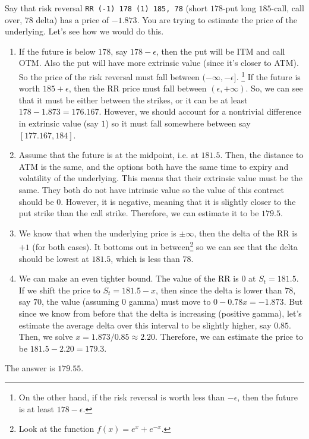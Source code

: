 \documentclass{article}
\begin{document}
    \begin{example}
      Say that risk reversal \texttt{RR (-1) 178 (1) 185, 78} (short $178$-put long $185$-call, call over, 78 delta) has a price of $-1.873$. You are trying to estimate the price of the underlying. Let's see how we would do this.
      \begin{enumerate}
        \item If the future is below $178$, say $178 - \epsilon$, then the put will be ITM and call OTM. Also the put will have more extrinsic value (since it's closer to ATM). So the price of the risk reversal must fall between $(-\infty, -\epsilon]$. \footnote{On the other hand, if the risk reversal is worth less than $-\epsilon$, then the future is at least $178 - \epsilon$. } If the future is worth $185 + \epsilon$, then the RR price must fall between $(\epsilon, +\infty)$. So, we can see that it must be either between the strikes, or it can be at least $178 - 1.873 = 176.167$. However, we should account for a nontrivial difference in extrinsic value (say $1$) so it must fall somewhere between say $[177.167, 184]$.

        \item Assume that the future is at the midpoint, i.e. at $181.5$. Then, the distance to ATM is the same, and the options both have the same time to expiry and volatility of the underlying. This means that their extrinsic value must be the same. They both do not have intrinsic value so the value of this contract should be $0$. However, it is negative, meaning that it is slightly closer to the put strike than the call strike. Therefore, we can estimate it to be $179.5$.

        \item We know that when the underlying price is $\pm \infty$, then the delta of the RR is $+1$ (for both cases). It bottoms out in between\footnote{Look at the function $f(x) = e^{x} + e^{-x}$.} so we can see that the delta should be lowest at $181.5$, which is less than $78$.

        \item We can make an even tighter bound. The value of the RR is $0$ at $S_t = 181.5$. If we shift the price to $S_t = 181.5 - x$, then since the delta is lower than $78$, say $70$, the value (assuming $0$ gamma) must move to $0 - 0.78 x = -1.873$. But since we know from before that the delta is increasing (positive gamma), let's estimate the average delta over this interval to be slightly higher, say $0.85$. Then, we solve $x = 1.873 / 0.85 \approx 2.20$. Therefore, we can estimate the price to be $181.5 - 2.20 = 179.3$.
      \end{enumerate}
      The answer is $179.55$.
    \end{example}
\end{document}
